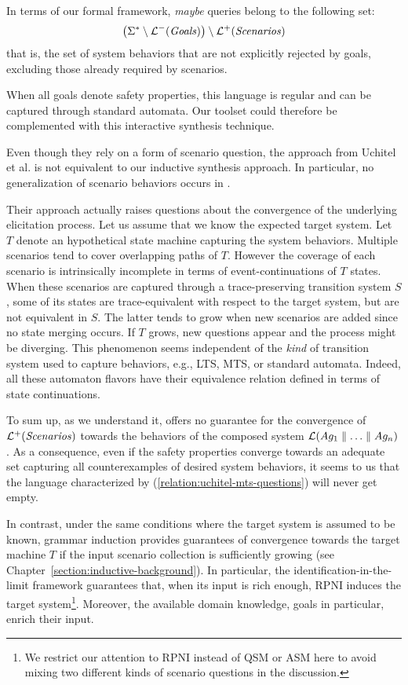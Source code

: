 In terms of our formal framework, \emph{maybe} queries belong to the following set:
\begin{align}
\left( \Sigma^* \setminus \mathcal{L}^-(\mbox{\emph{Goals}}) \right) \setminus \mathcal{L}^+(\mbox{\emph{Scenarios}})
\label{relation:uchitel-mts-questions}
\end{align}
that is, the set of system behaviors that are not explicitly rejected by goals, excluding those already required by scenarios.

When all goals denote safety properties, this language is regular and can be captured through standard automata. Our toolset could therefore be complemented with this interactive synthesis technique.

Even though they rely on a form of scenario question, the approach from Uchitel et al. is not equivalent to our inductive synthesis approach. In particular, no generalization of scenario behaviors occurs in \cite{Uchitel:2007, Uchitel:2009}. 

Their approach actually raises questions about the convergence of the underlying elicitation process. Let us assume that we know the expected target system. Let $T$ denote an hypothetical state machine capturing the system behaviors. Multiple scenarios tend to cover overlapping paths of $T$. However the coverage of each scenario is intrinsically incomplete in terms of event-continuations of $T$ states. When these scenarios are captured through a trace-preserving transition system $S$, some of its states are trace-equivalent with respect to the target system, but are not equivalent in $S$. The latter tends to grow when new scenarios are added since no state merging occurs. If $T$ grows, new questions appear and the process might be diverging. This phenomenon seems independent of the \emph{kind} of transition system used to capture behaviors, e.g., LTS, MTS, or standard automata. Indeed, all these automaton flavors have their equivalence relation defined in terms of state continuations.

To sum up, as we understand it, \cite{Uchitel:2009} offers no guarantee for the convergence of $\mathcal{L}^+(\mbox{\emph{Scenarios}})$ towards the behaviors of the composed system $\mathcal{L}(Ag_1 \parallel \ldots \parallel Ag_n)$. As a consequence, even if the safety properties converge towards an adequate set capturing all counterexamples of desired system behaviors, it seems to us that the language characterized by (\ref{relation:uchitel-mts-questions}) will never get empty. 

In contrast, under the same conditions where the target system is assumed to be known, grammar induction provides guarantees of convergence towards the target machine $T$ if the input scenario collection is sufficiently growing \cite{Oncina:1993} (see Chapter~\ref{section:inductive-background}). In particular, the identification-in-the-limit framework guarantees that, when its input is rich enough, RPNI induces the target system\footnote{We restrict our attention to RPNI instead of QSM or ASM here to avoid mixing two different kinds of scenario questions in the discussion.}. Moreover, the available domain knowledge, goals in particular, enrich their input.


